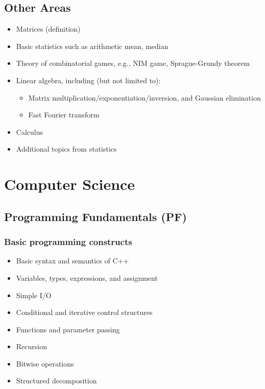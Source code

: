\documentclass[12pt]{article}
\begin{document}
	\subsection{Other Areas}
		\begin{itemize}[label=]
			\item Matrices (definition)
			\item Basic statistics such as arithmetic mean, median
		\end{itemize}
	
		\begin{itemize}[label=]
			\item Theory of combinatorial games, e.g., NIM game, Sprague-Grundy theorem
			\item Linear algebra, including (but not limited to):
				\begin{itemize}[label=$\bullet$,leftmargin=12pt,topsep=-\parskip]
					\item Matrix multiplication/exponentiation/inversion, and Gaussian elimination
					\item Fast Fourier transform
				\end{itemize}
			\item Calculus
			\item Additional topics from statistics
		\end{itemize}
	
	\section{Computer Science}
	\subsection{Programming Fundamentals (PF)}
		\renewcommand{\type}{PF}
		\subsubsection{Basic programming constructs}
		\begin{itemize}[label=]
			\item Basic syntax and semantics of C++
			\item Variables, types, expressions, and assignment
			\item Simple I/O
			\item Conditional and iterative control structures
			\item Functions and parameter passing
			\item Recursion
			\item Bitwise operations
			\item Structured decomposition
		\end{itemize}
		
\end{document}
